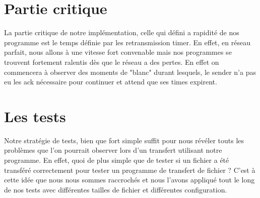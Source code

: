 \documentclass[12pt,notitlepage]{report}
\begin{document}
\section{Partie critique}
	La partie critique de notre implémentation, celle qui défini a rapidité de nos programme est le temps définie par les retransmission timer. En effet, en réseau parfait, nous allons à une vitesse fort convenable mais nos programmes se trouvent fortement ralentis dès que le réseau a des pertes. En effet on commencera à observer des moments de "blanc" durant lesquels, le sender n'a pas eu les ack nécessaire pour continuer et attend que ses times expirent.

\section{Les tests}
	Notre stratégie de tests, bien que fort simple suffit pour nous révéler touts les problèmes que l'on pourrait observer lors d'un transfert utilisant notre programme. En effet, quoi de plus simple que de tester si un fichier a été transféré correctement pour tester un programme de transfert de fichier ? C'est à cette idée que nous nous sommes raccrochés et nous l'avons appliqué tout le long de nos tests avec différentes tailles de fichier et différentes configuration. 
\end{document}
